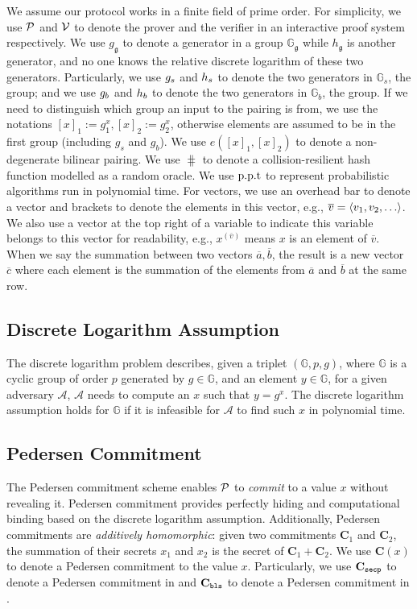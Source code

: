 We assume our protocol works in a finite field of prime order. For simplicity, we use $\mathcal{P}$ and $\mathcal{V}$ to denote the prover and the verifier in an interactive proof system respectively. We use $g_\mathfrak{g}$ to denote a generator in a group $\mathbb{G}_\mathfrak{g}$ while $h_\mathfrak{g}$ is another generator, and no one knows the relative discrete logarithm of these two generators. Particularly, we use $g_s$ and $h_s$ to denote the two generators in $\mathbb{G}_s$, the \secp group; and we use $g_b$ and $h_b$ to denote the two generators in $\mathbb{G}_b$, the \bls group. If we need to distinguish which group an input to the pairing is from, we use the notations $[x]_1:=g_1^x,[x]_2:=g_2^x$, otherwise elements are  assumed to be in the first group (including $g_s$ and $g_b$). We use $e([x]_1,[x]_2)$ to denote a non-degenerate bilinear pairing. We use $\hash$ to denote a collision-resilient hash function modelled as a random oracle. We use $\text{p.p.t}$ to represent probabilistic algorithms run in polynomial time.  For vectors, we use an overhead bar to denote a vector and brackets to denote the elements in this vector, e.g., $\overline{v}=\tuple{v_1,v_2,\dots}$. We also use a vector at the top right of a variable to indicate this variable belongs to this vector for readability, e.g., $x^{(\overline{v})}$ means $x$ is an element of $\overline{v}$. When we say the summation between two vectors $\overline{a},\overline{b}$, the result is a new vector $\overline{c}$ where each element is the summation of the elements from $\overline{a}$ and $\overline{b}$ at the same row.

\subsection{Discrete Logarithm Assumption}
\label{sec:dlp}
The discrete logarithm problem describes, given a triplet $(\mathbb{G}, p, g)$, where $\mathbb{G}$ is a cyclic group of order $p$ generated by $g\in\mathbb{G}$, and an element $y\in\mathbb{G}$, for a given adversary $\mathcal{A}$, $\mathcal{A}$ needs to compute an $x$ such that $y=g^x$. The discrete logarithm assumption holds for $\mathbb{G}$ if it is infeasible for $\mathcal{A}$ to find such $x$ in polynomial time.

\subsection{Pedersen Commitment}
\label{sec:pedersen}
The Pedersen commitment scheme \cite{pedersen} enables $\mathcal{P}$ to \textit{commit} to a value $x$ without revealing it. Pedersen commitment provides perfectly hiding and computational binding based on the discrete logarithm assumption. Additionally, Pedersen commitments are \textit{additively homomorphic}: given two commitments $\textbf{C}_1$ and $\textbf{C}_2$, the summation of their secrets $x_1$ and $x_2$ is the secret of $\textbf{C}_1+\textbf{C}_2$. We use $\textbf{C}(x)$ to denote a Pedersen commitment to the value $x$. Particularly, we use $\textbf{C}_\texttt{secp}$ to denote a Pedersen commitment in \secp and $\textbf{C}_\texttt{bls}$ to denote a Pedersen commitment in \bls.

